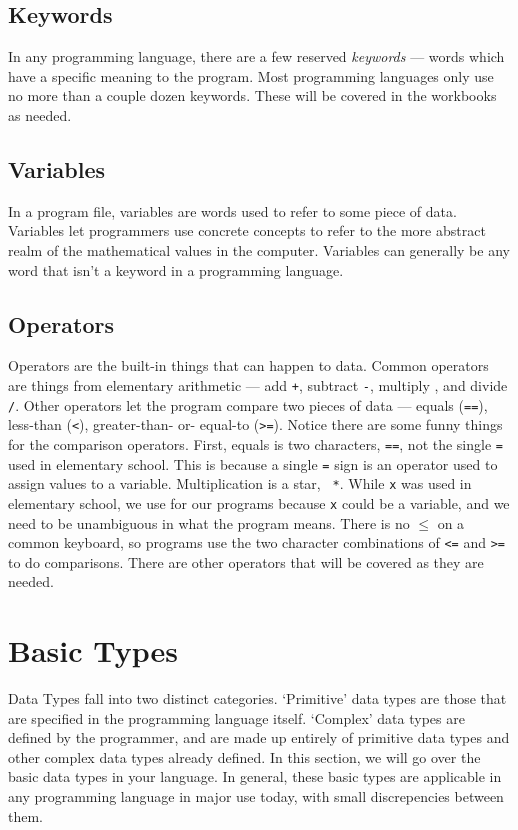 \subsection{Keywords}

In any programming language, there are a few reserved {\it keywords} --- words
which have a specific meaning to the program. Most programming languages only
use no more than a couple dozen keywords. These will be covered in the
workbooks as needed.

\subsection{Variables}

In a program file, variables are words used to refer to some piece of data.
Variables let programmers use concrete concepts to refer to the more abstract
realm of the mathematical values in the computer. Variables can generally be
any word that isn't a keyword in a programming language.

\subsection{Operators}

Operators are the built-in things that can happen to data. Common operators
are things from elementary arithmetic --- add {\tt +}, subtract {\tt -},
multiply {\tt *}, and divide {\tt /}. Other operators let the program compare
two pieces of data --- equals ({\tt ==}), less-than ({\tt <}), greater-than-
or- equal-to ({\tt >=}). Notice there are some funny things for the comparison
operators. First, equals is two characters, {\tt ==}, not the single {\tt =}
used in elementary school. This is because a single {\tt =} sign is an
operator used to assign values to a variable. Multiplication is a star, {\tt
*}. While {\tt x} was used in elementary school, we use {\tt *} for our
programs because {\tt x} could be a variable, and we need to be unambiguous in
what the program means. There is no $\le$ on a common keyboard, so programs
use the two character combinations of {\tt <=} and {\tt >=} to do comparisons.
There are other operators that will be covered as they are needed.

\section{Basic Types}

Data Types fall into two distinct categories. `Primitive' data types are those
that are specified in the programming language itself. `Complex' data types
are defined by the programmer, and are made up entirely of primitive data
types and other complex data types already defined. In this section, we will
go over the basic data types in your language. In general, these basic types
are applicable in any programming language in major use today, with small
discrepencies between them.

